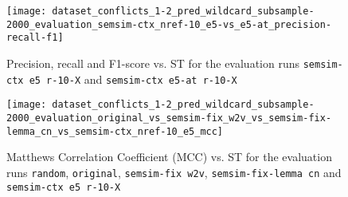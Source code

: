 \begin{figure}[H]
\centering
\texttt{[image: dataset\_conflicts\_1-2\_pred\_wildcard\_subsample-2000\_evaluation\_semsim-ctx\_nref-10\_e5-vs\_e5-at\_precision-recall-f1]}
\caption{Precision, recall and F1-score vs. ST for the evaluation runs \texttt{semsim-ctx e5 r-10-X} and \texttt{semsim-ctx e5-at r-10-X}}
\label{fig:prec-rec-f1-semsim-ctx-at}
\end{figure}

\begin{figure}[H]
\centering
\texttt{[image: dataset\_conflicts\_1-2\_pred\_wildcard\_subsample-2000\_evaluation\_original\_vs\_semsim-fix\_w2v\_vs\_semsim-fix-lemma\_cn\_vs\_semsim-ctx\_nref-10\_e5\_mcc]}
\caption{Matthews Correlation Coefficient (MCC) vs. ST for the evaluation runs \texttt{random}, \texttt{original}, \texttt{semsim-fix w2v}, \texttt{semsim-fix-lemma cn} and \texttt{semsim-ctx e5 r-10-X}}
\label{fig:mcc}
\end{figure}


